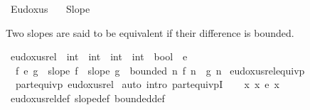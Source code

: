 %
\begin{isabellebody}%
%
%
\isadelimtheory
\isanewline
\isanewline
%
\endisadelimtheory
%
\isatagtheory
{}\isamarkupfalse%
\ Eudoxus\isanewline
\ \ \ Slope\isanewline
{}%
\endisatagtheory
{\isafoldtheory}%
%
\isadelimtheory
%
\endisadelimtheory
%
\isadelimdocument
%
\endisadelimdocument
%
\isatagdocument
%
\isamarkuptrue%
%
\isamarkuptrue%
%
\endisatagdocument
{\isafolddocument}%
%
\isadelimdocument
%
\endisadelimdocument
%
\begin{isamarkuptext}%
Two slopes are said to be equivalent if their difference is bounded.%
\end{isamarkuptext}\isamarkuptrue%
\isamarkupfalse%
\ eudoxus{\isacharunderscore}{\kern0pt}rel\ {\isacharcolon}{\kern0pt}{\isacharcolon}{\kern0pt}\ {\isachardoublequoteopen}{\isacharparenleft}{\kern0pt}int\ {\isasymRightarrow}\ int{\isacharparenright}{\kern0pt}\ {\isasymRightarrow}\ {\isacharparenleft}{\kern0pt}int\ {\isasymRightarrow}\ int{\isacharparenright}{\kern0pt}\ {\isasymRightarrow}\ bool{\isachardoublequoteclose}\ {\isacharparenleft}{\kern0pt}\ {\isachardoublequoteopen}{\isasymsim}\isactrlsub e{\isachardoublequoteclose}\ {}{}{\isacharparenright}{\kern0pt}\ \ \isanewline
\ \ {\isachardoublequoteopen}f\ {\isasymsim}\isactrlsub e\ g\ {\isasymequiv}\ slope\ f\ {\isasymand}\ slope\ g\ {\isasymand}\ bounded\ {\isacharparenleft}{\kern0pt}{\isasymlambda}n{\isachardot}{\kern0pt}\ f\ n\ {\isacharminus}{\kern0pt}\ g\ n{\isacharparenright}{\kern0pt}{\isachardoublequoteclose}\isanewline
\isanewline
{}\isamarkupfalse%
\ eudoxus{\isacharunderscore}{\kern0pt}rel{\isacharunderscore}{\kern0pt}equivp{\isacharcolon}{\kern0pt}\isanewline
\ \ {\isachardoublequoteopen}part{\isacharunderscore}{\kern0pt}equivp\ eudoxus{\isacharunderscore}{\kern0pt}rel{\isachardoublequoteclose}\isanewline
%
\isadelimproof
%
\endisadelimproof
%
\isatagproof
{}\isamarkupfalse%
\ {\isacharparenleft}{\kern0pt}auto\ intro{\isacharbang}{\kern0pt}{\isacharcolon}{\kern0pt}\ part{\isacharunderscore}{\kern0pt}equivpI{\isacharparenright}{\kern0pt}\isanewline
\ \ \isamarkupfalse%
\ {\isachardoublequoteopen}{\isasymexists}x{\isachardot}{\kern0pt}\ x\ {\isasymsim}\isactrlsub e\ x{\isachardoublequoteclose}\ \isamarkupfalse%
\ eudoxus{\isacharunderscore}{\kern0pt}rel{\isacharunderscore}{\kern0pt}def\ slope{\isacharunderscore}{\kern0pt}def\ bounded{\isacharunderscore}{\kern0pt}def\ \isamarkupfalse%

\end{isabellebody}
